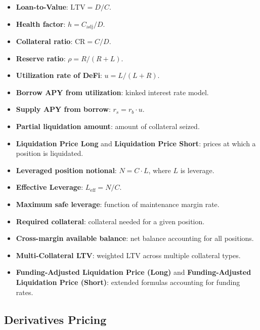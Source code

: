 \documentclass[twoside,11pt]{article}
\begin{document}
\begin{itemize}
  \item \textbf{Loan-to-Value}: $\mathrm{LTV} = D/C$.
  \item \textbf{Health factor}: $h = C_{\mathrm{adj}} / D$.
  \item \textbf{Collateral ratio}: $\mathrm{CR} = C/D$.
  \item \textbf{Reserve ratio}: $\rho = R / (R + L)$.
  \item \textbf{Utilization rate of DeFi}: $u = L / (L + R)$.
  \item \textbf{Borrow APY from utilization}: kinked interest rate model.
  \item \textbf{Supply APY from borrow}: $r_s = r_b \cdot u$.
  \item \textbf{Partial liquidation amount}: amount of collateral seized.
  \item \textbf{Liquidation Price Long} and \textbf{Liquidation Price Short}:
    prices at which a position is liquidated.
  \item \textbf{Leveraged position notional}: $N = C \cdot L$, where $L$ is leverage.
  \item \textbf{Effective Leverage}: $L_{\mathrm{eff}} = N/C$.
  \item \textbf{Maximum safe leverage}: function of maintenance margin rate.
  \item \textbf{Required collateral}: collateral needed for a given position.
  \item \textbf{Cross-margin available balance}: net balance accounting for all positions.
  \item \textbf{Multi-Collateral LTV}: weighted LTV across multiple collateral types.
  \item \textbf{Funding-Adjusted Liquidation Price (Long)} and
    \textbf{Funding-Adjusted Liquidation Price (Short)}: extended formulas accounting for funding rates.
\end{itemize}

\subsection{Derivatives Pricing}\label{subsec:derivatives-pricing}
\label{sec:bench_derivatives}
\end{document}
